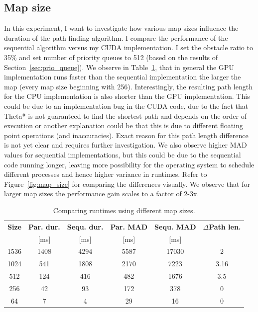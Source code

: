 \documentclass{article}
\begin{document}
\subsection{Map size}
%
In this experiment, I want to investigate how various map sizes influence the duration of the path-finding algorithm. I compare the performance of the sequential algorithm versus my CUDA implementation. I set the obstacle ratio to 35\% and set number of priority queues to 512 (based on the results of Section~\ref{sec:prio_queue}). We observe in Table~\ref{tab:map_size}, that in general the GPU implementation runs faster than the sequential implementation the larger the map (every map size beginning with 256). Interestingly, the resulting path length for the CPU implementation is also shorter than the GPU implementation. This could be due to an implementation bug in the CUDA code, due to the fact that Theta* is not guaranteed to find the shortest path and depends on the order of execution or another explanation could be that this is due to different floating point operations (and inaccuracies). Exact reason for this path length difference is not yet clear and requires further investigation. We also observe higher MAD values for sequential implementations, but this could be due to the sequential code running longer, leaving more possibility for the operating system to schedule different processes and hence higher variance in runtimes. Refer to Figure~\ref{fig:map_size} for comparing the differences visually. We observe that for larger map sizes the performance gain scales to a factor of 2-3x.
%
\begin{table}[]
    \centering
    \begin{tabular}{|c|c|c|c|c|c|}
        \hline
        \textbf{Size} & \textbf{Par. dur.} & \textbf{Sequ. dur.} & \textbf{Par. MAD} & \textbf{Sequ. MAD} & \textbf{$\Delta$Path len.} \\
        &[ms] & [ms] & [ms] & [ms] & \\
        \hline
        1536 & 1408 & 4294 & 5587 & 17030 & 2 \\
        \hline
        1024 & 541 & 1808 & 2170 & 7223 & 3.16 \\
        \hline
        512 & 124 & 416 & 482 & 1676 & 3.5 \\
        \hline
        256 & 42 & 93 & 172 & 378 & 0 \\
        \hline
        64 & 7 & 4 & 29 & 16 & 0 \\
        \hline
    \end{tabular}
    \caption{Comparing runtimes using different map sizes.}
    \label{tab:map_size}
\end{table}
\end{document}
